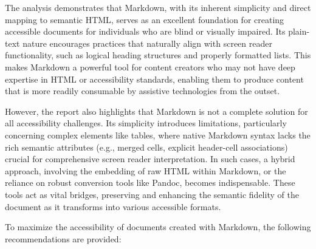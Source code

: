 The analysis demonstrates that Markdown, with its inherent simplicity and direct mapping to semantic HTML, serves as an excellent foundation for creating accessible documents for individuals who are blind or visually impaired. Its plain-text nature encourages practices that naturally align with screen reader functionality, such as logical heading structures and properly formatted lists. This makes Markdown a powerful tool for content creators who may not have deep expertise in HTML or accessibility standards, enabling them to produce content that is more readily consumable by assistive technologies from the outset.

However, the report also highlights that Markdown is not a complete solution for all accessibility challenges. Its simplicity introduces limitations, particularly concerning complex elements like tables, where native Markdown syntax lacks the rich semantic attributes (e.g., merged cells, explicit header-cell associations) crucial for comprehensive screen reader interpretation. In such cases, a hybrid approach, involving the embedding of raw HTML within Markdown, or the reliance on robust conversion tools like Pandoc, becomes indispensable. These tools act as vital bridges, preserving and enhancing the semantic fidelity of the document as it transforms into various accessible formats.

To maximize the accessibility of documents created with Markdown, the following recommendations are provided:

